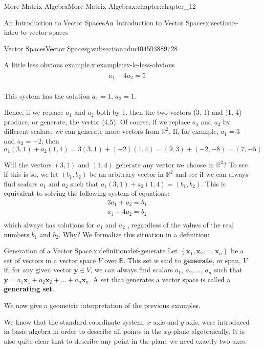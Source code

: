 \documentclass[twoside,10pt,]{book}
\newcommand{\terminology}[1]{\textbf{#1}}
\numberwithin{equation}{section}
\renewcommand{\vec}[1]{\mathbf{#1}}
\begin{document}
\begin{chapterptx}{More Matrix Algebra}{}{More Matrix Algebra}{}{}{x:chapter:chapter_12}
\begin{sectionptx}{An Introduction to Vector Spaces}{}{An Introduction to Vector Spaces}{}{}{x:section:s-intro-to-vector-spaces}
\begin{subsectionptx}{Vector Spaces}{}{Vector Spaces}{}{}{g:subsection:idm404593889728}
\begin{example}{A little less obvious example.}{x:example:ex-lc-less-obvious}
\begin{equation*}
\begin{array}{ccc}
\begin{array}{c}
a_1+ 4a_2 =5\\
\end{array}\\
\\
\end{array}
\end{equation*}
This system has the solution \(a_1=1\), \(a_2=1\).%
\par
Hence, if we replace \(a_1\) and \(a_2\) both by 1, then the two vectors (3, 1) and (1, 4) produce, or generate, the vector (4,5). Of course, if we replace \(a_1\) and \(a_2\) by different scalars, we can generate more vectors from \(\mathbb{R}^2\). If, for example, \(a
_1 = 3\) and \(a_2 = -2\), then%
\begin{equation*}
a_1(3, 1) + a_2 (1, 4) = 3 (3, 1) +(-2) (1,4) = (9, 3) +(-2,-8) = (7, -5)
\end{equation*}
%
\end{example}
Will the vectors \((3, 1)\) and \((1,4)\) generate any vector we choose in \(\mathbb{R}^2\)?  To see if this is so, we let \(\left(b_1,b_2\right)\) be an arbitrary vector in \(\mathbb{R}^2\) and see if we can always find scalars \(a_1\) and \(a_2\) such that \(a_1(3, 1) + a_2 (1, 4)= \left(b_1,b_2\right)\). This is equivalent to solving the following system of equations:%
\begin{equation*}
\begin{array}{c}
3a_1+ a_2 =b_1\\
a_1+4a_2 =b_2\\
\end{array}
\end{equation*}
which always has solutions for \(a_1\) and \(a_2\) , regardless of the values of the real numbers \(b_1\) and \(b_2\). Why?   We formalize this situation in a definition:%
\begin{definition}{Generation of a Vector Space.}{x:definition:def-generate}%
%
%
Let \(\left\{\vec{x}_1,\vec{x}_2, \ldots ,\vec{x}_n\right\}\) be a set of vectors in a vector space \(V\) over \(\mathbb{R}\). This set is said to \terminology{generate}, or span, \(V\) if, for any given vector \(\vec{y} \in V\), we can always find scalars \(a_1\), \(a_2,
\ldots\), \(a_n\) such that \(\vec{y} = a_1 \vec{x}_1+a_2 \vec{x}_2+\ldots +a_n \vec{x}_n\).  A set that generates a vector space is called a \terminology{generating set}.%
\end{definition}
We now give a geometric interpretation of the previous examples.%
\par
We know that the standard coordinate system, \(x\) axis and \(y\) axis, were introduced in basic algebra in order to describe all points in the \(xy\)-plane algebraically. It is also quite clear that to describe any point in the plane we need exactly two axes.%

\end{subsectionptx}
\end{sectionptx}
\end{chapterptx}
\end{document}
